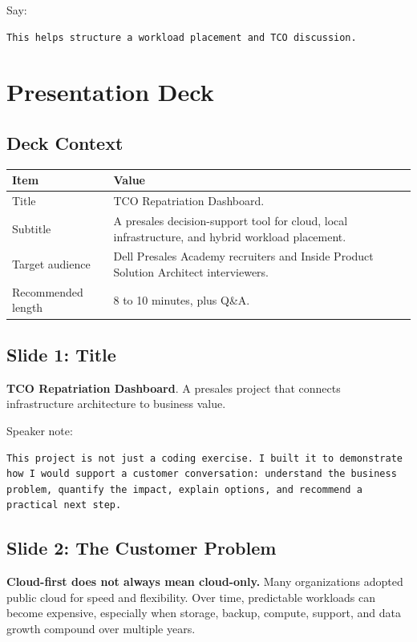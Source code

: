 \documentclass[11pt,a4paper]{article}
\begin{document}
Say:

\begin{lstlisting}
This helps structure a workload placement and TCO discussion.
\end{lstlisting}

\section{Presentation Deck}

\subsection{Deck Context}

\begin{longtable}{p{}p{}}
\toprule
\textbf{Item} & \textbf{Value} \\
\midrule
Title & TCO Repatriation Dashboard. \\
Subtitle & A presales decision-support tool for cloud, local infrastructure, and hybrid workload placement. \\
Target audience & Dell Presales Academy recruiters and Inside Product Solution Architect interviewers. \\
Recommended length & 8 to 10 minutes, plus Q\&A. \\
\bottomrule
\end{longtable}

\subsection{Slide 1: Title}

\textbf{TCO Repatriation Dashboard}. A presales project that connects infrastructure architecture to business value.

Speaker note:

\begin{lstlisting}
This project is not just a coding exercise. I built it to demonstrate how I would support a customer conversation: understand the business problem, quantify the impact, explain options, and recommend a practical next step.
\end{lstlisting}

\subsection{Slide 2: The Customer Problem}

\textbf{Cloud-first does not always mean cloud-only.} Many organizations adopted public cloud for speed and flexibility. Over time, predictable workloads can become expensive, especially when storage, backup, compute, support, and data growth compound over multiple years.
\end{document}
